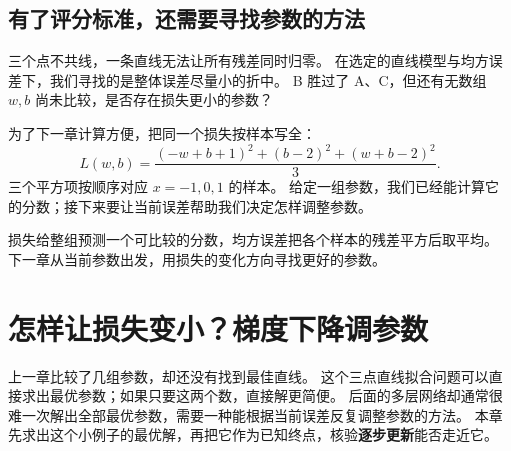 \subsection{有了评分标准，还需要寻找参数的方法}

三个点不共线，一条直线无法让所有残差同时归零。
在选定的直线模型与均方误差下，我们寻找的是整体误差尽量小的折中。
B 胜过了 A、C，但还有无数组 $w,b$ 尚未比较，是否存在损失更小的参数？

为了下一章计算方便，把同一个损失按样本写全：
\begin{equation}
L(w,b)=\frac{(-w+b+1)^2+(b-2)^2+(w+b-2)^2}{3}.
\label{eq:three-point-residual-loss}
\end{equation}
三个平方项按顺序对应 $x=-1,0,1$ 的样本。
给定一组参数，我们已经能计算它的分数；接下来要让当前误差帮助我们决定怎样调整参数。


\par\smallskip
损失给整组预测一个可比较的分数，均方误差把各个样本的残差平方后取平均。
下一章从当前参数出发，用损失的变化方向寻找更好的参数。


\chapterrule
\section{怎样让损失变小？梯度下降调参数}
\label{intro:16a-gradient-descent}

上一章比较了几组参数，却还没有找到最佳直线。
这个三点直线拟合问题可以直接求出最优参数；如果只要这两个数，直接解更简便。
后面的多层网络却通常很难一次解出全部最优参数，需要一种能根据当前误差反复调整参数的方法。
本章先求出这个小例子的最优解，再把它作为已知终点，核验\textbf{逐步更新}能否走近它。

